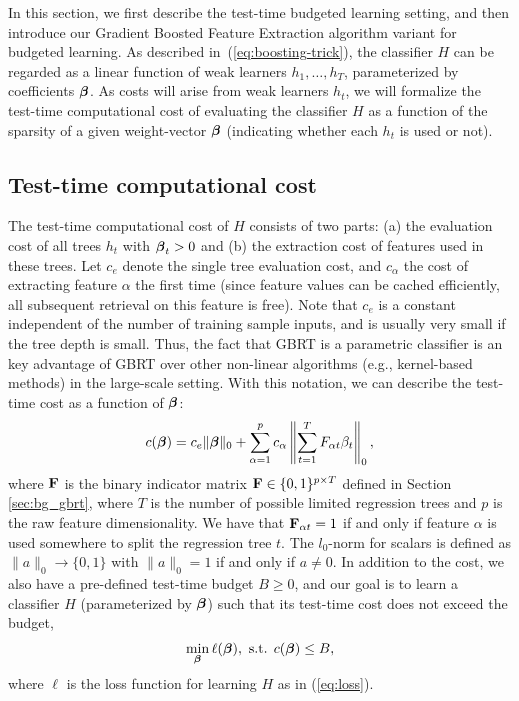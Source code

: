 In this section, we first describe the test-time budgeted learning setting, and then introduce our Gradient Boosted Feature Extraction algorithm variant for budgeted learning. As described in~(\ref{eq:boosting-trick}), the classifier $H$ can be regarded as a linear function of weak learners $h_1, \ldots, h_T$, %
parameterized by coefficients $\boldsymbol{\beta}$. As costs will arise from weak learners $h_t$, we will formalize the test-time computational cost of evaluating the classifier $H$ as a function of the sparsity of a given weight-vector $\boldsymbol{\beta}$ (indicating whether each $h_t$ is used or not). 

\subsection{Test-time computational cost}
The test-time computational cost of $H$ consists of two parts: (a) the evaluation cost of all trees $h_t$ with $\boldsymbol{\beta}_t > 0$ and (b) the extraction cost of features used in these trees. Let $c_e$ denote the single tree evaluation cost, and $c_\alpha$ the cost of extracting feature $\alpha$ the first time (since feature values can be cached efficiently, all subsequent retrieval on this feature is free). Note that $c_e$ is a constant independent of the number of training sample inputs, and is usually very small if the tree depth is small. Thus, the fact that GBRT is a parametric classifier is an key advantage of GBRT over other non-linear algorithms (e.g., kernel-based methods) in the large-scale setting. %
With this notation, we can describe the test-time cost as a function of $\boldsymbol{\beta}$:
\begin{align}
	c(\boldsymbol{\beta})=c_e\|\boldsymbol{\beta}\|_0+\sum_{\alpha=1}^p c_\alpha\left\|\sum_{t=1}^T F_{\alpha t} \beta_t\right\|_0, \label{eq:cost}
\end{align}
where $\mathbf{F}$ is the binary indicator matrix $\mathbf{F} \in \{0,1\}^{p \times T}$ defined in Section \ref{sec:bg_gbrt}, where $T$ is the number of possible limited regression trees and $p$ is the raw feature dimensionality. We have that $\mathbf{F}_{\alpha t} = 1$ if and only if feature $\alpha$ is used somewhere to split the regression tree $t$. The $l_0$-norm for scalars is defined as $\|a\|_0\rightarrow\{0,1\}$ with $\|a\|_0=1$ if and only if $a\neq 0$. In addition to the cost, we also have a pre-defined test-time budget $B \ge 0$, and our goal is to learn a classifier $H$ (parameterized by $\boldsymbol{\beta}$) such that its test-time cost does not exceed the budget,
\begin{align}
	\min_{\boldsymbol{\beta}} \ell(\boldsymbol{\beta}), \textrm{ s.t. } c(\boldsymbol{\beta}) \le B, \label{eq:budget_loss}
\end{align}
where $\ell$ is the loss function for learning $H$ as in (\ref{eq:loss}).

